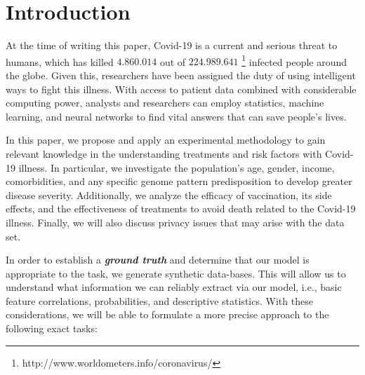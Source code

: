 \section{Introduction}
\label{sec:introduction}

At the time of writing this paper, Covid-19 is a current and serious threat to humans, which has killed $4.860.014$ out of $224.989.641$ \footnote{http://www.worldometers.info/coronavirus/} infected people around the globe. Given this, researchers have been assigned the duty of using intelligent ways to fight this illness. With access to patient data combined with considerable computing power, analysts and researchers can employ statistics, machine learning, and neural networks to find vital answers that can save people's lives.

In this paper, we propose and apply an experimental methodology to gain relevant knowledge in the understanding treatments and risk factors with Covid-19 illness. In particular, we investigate the population's age, gender, income, comorbidities, and any specific genome pattern predisposition to develop greater disease severity. Additionally, we analyze the efficacy of vaccination, its side effects, and the effectiveness of treatments to avoid death related to the Covid-19 illness. Finally, we will also discuss privacy issues that may arise with the data set.

In order to establish a \textbf{\textit{ground truth}} and determine that our model is appropriate to the task, we generate synthetic data-bases. This will allow us to understand what information we can reliably extract via our model, i.e., basic feature correlations, probabilities, and descriptive statistics. With these considerations, we will be able to formulate a more precise approach to the following exact tasks:

